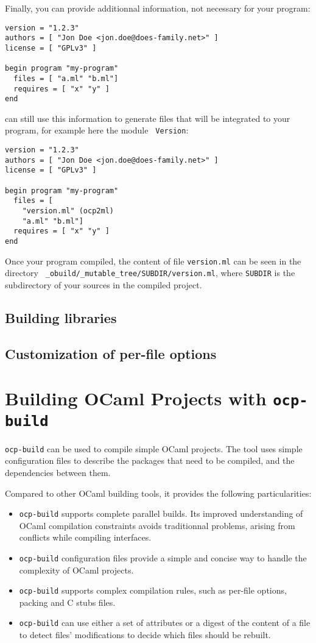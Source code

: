 Finally, you can provide additionnal information, not necessary for
your program:
\begin{verbatim}
version = "1.2.3"
authors = [ "Jon Doe <jon.doe@does-family.net>" ]
license = [ "GPLv3" ]

begin program "my-program"
  files = [ "a.ml" "b.ml"]
  requires = [ "x" "y" ]
end
\end{verbatim}

\ocpbuild{} can still use this information to generate files that will
be integrated to your program, for example here the module {\tt
  Version}:
\begin{verbatim}
version = "1.2.3"
authors = [ "Jon Doe <jon.doe@does-family.net>" ]
license = [ "GPLv3" ]

begin program "my-program"
  files = [ 
    "version.ml" (ocp2ml)
    "a.ml" "b.ml"]
  requires = [ "x" "y" ]
end
\end{verbatim}

Once your program compiled, the content of file {\tt version.ml} can
be seen in the directory {\tt
  \_obuild/\_mutable\_tree/SUBDIR/version.ml}, where {\tt SUBDIR} is
the subdirectory of your sources in the compiled project.

\section{Building libraries}

\section{Customization of per-file options}

\chapter{Building OCaml Projects with {\tt ocp-build}}

{\tt ocp-build} can be used to compile simple OCaml projects.
The tool uses simple configuration files to describe the
packages that need to be compiled, and the dependencies between
them.

Compared to other OCaml building tools, it provides the following
particularities:
\begin{itemize}
\item {\tt ocp-build} supports complete parallel builds. Its improved
  understanding of OCaml compilation constraints avoids traditionnal
  problems, arising from conflicts while compiling interfaces.
\item {\tt ocp-build} configuration files provide a simple and concise
  way to handle the complexity of OCaml projects.
\item {\tt ocp-build} supports complex compilation rules, such as
  per-file options, packing and C stubs files.
\item {\tt ocp-build} can use either a set of attributes or a digest
  of the content of a file to detect files' modifications to decide
  which files should be rebuilt.
\end{itemize}

